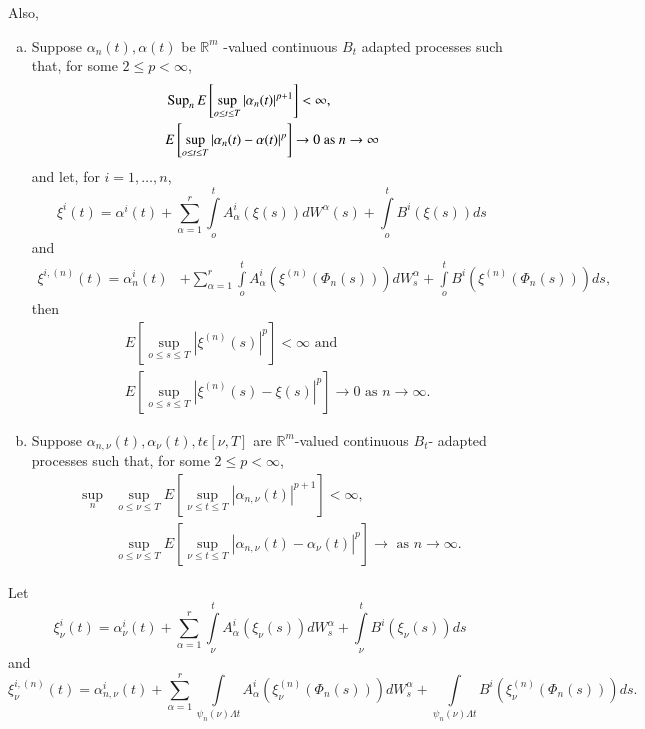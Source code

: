  Also,
\begin{enumerate} [(a)]
\item Suppose $\alpha_n (t), \alpha(t)$ be $\mathbb{R}^m$ -valued
  continuous $B_t$ adapted processes such that, for some  $2 \le  p <
  \infty$,  
  \begin{align*}
    & \operatorname{Sup}_n E \left[ \sup_{o \le t \le T} | \alpha_n (t) |^{p+1}\right]< \infty, \\
    &  E \left[ \sup_{o \le t \le T} | \alpha_n (t) - \alpha (t)|^p\right] \to 0
    \text{ as } n \to \infty 
  \end{align*}
  and let, for $i=1, \ldots, n$,
  $$
  \xi^i (t) = \alpha^i (t) +  \sum_{\alpha=1}^{r} \int\limits_{o}^t 
  A^i_\alpha (\xi(s)) dW^\alpha (s) +  \int\limits_{o}^t B^i (\xi
  (s))ds 
  $$
  and 
  \begin{align*}
    \xi^{i, (n)} (t) = \alpha^i_n (t) &+ \sum_{\alpha=1}^{r}
    \int\limits_{o}^t A^i_\alpha( \xi^{(n)} (\Phi_n(s))) dW^\alpha_s
    + \int\limits_{o}^t B^i (\xi^{(n)} ( \Phi_n(s))) ds,
  \end{align*} 
  then\pageoriginale 
  \begin{align*}
    & E \left[ \sup_{o \le s \le T} |  \xi^{(n)} (s) |^p\right] <
    \infty \text{ and }\\ 
    & E \left[ \sup_{o \le s \le T} |  \xi^{(n)} (s)- \xi (s) |^p
      \right] \to 0 \text{ as } n \to \infty. 
  \end{align*} 

\item Suppose $\alpha_{n,\nu}(t), \alpha_\nu (t), t \epsilon  [\nu,
  T]$ are $\mathbb{R}^m$-valued continuous $B_t$- adapted processes
  such that, for some  $2 \le p < \infty$, 
  \begin{align*}
     \sup_n & \sup_{o \le \nu \le T} E \left[ \sup_{\nu \le t \le T} |
      \alpha _{n, \nu}(t) |^{p+1}\right] < \infty,\\ 
    & \sup_{o \le \nu \le T} E \left[ \sup_{\nu \le t \le T} |  \alpha _{n,
        \nu}(t) - \alpha_\nu  (t) | ^p\right] \to \text{ as } n \to \infty. 
 \end{align*}
\end{enumerate} 
 
 Let
 $$
  \xi ^i_\nu (t) = \alpha^i_\nu(t) + \sum_{\alpha=1}^{r}
  \int\limits_{\nu}^{t} A^i_{\alpha}(\xi_\nu(s)) dW^\alpha_s +
  \int\limits_{\nu}^t B^i (\xi_\nu(s)) ds 
 $$
 and 
{\fontsize{10pt}{12pt}\selectfont
 $$
 \xi^{i, (n)}_\nu (t) = \alpha^i_{n, \nu}(t) + \sum_{\alpha =1}^{r}
 \int\limits_{\psi_n(\nu) \Lambda t} A^i_\alpha (\xi _\nu^{(n)}(\Phi_n
 (s)))dW^\alpha_s +  \int\limits_{\psi_n(\nu) \Lambda t} B^i (\xi
 _\nu^{(n)}(\Phi_n (s)))ds. 
 $$}\relax
 
